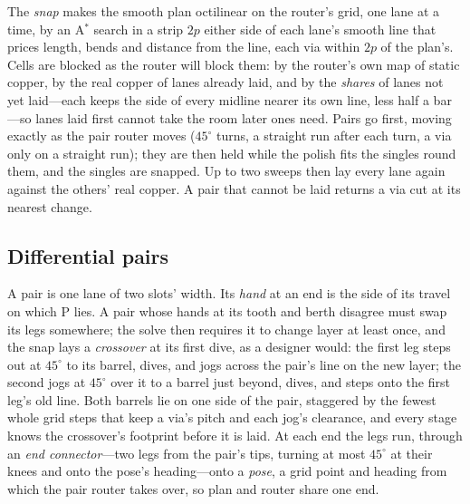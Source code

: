 \documentclass[journal]{IEEEtran}
\begin{document}
\label{sec:snap}The \emph{snap} makes the smooth plan octilinear on the router's grid, one lane at a time, by an A$^*$ search in a strip $2p$ either side of each lane's smooth line that prices length, bends and distance from the line, each via within $2p$ of the plan's. Cells are blocked as the router will block them: by the router's own map of static copper, by the real copper of lanes already laid, and by the \emph{shares} of lanes not yet laid---each keeps the side of every midline nearer its own line, less half a bar---so lanes laid first cannot take the room later ones need. Pairs go first, moving exactly as the pair router moves ($45^\circ$ turns, a straight run after each turn, a via only on a straight run); they are then held while the polish fits the singles round them, and the singles are snapped. Up to two sweeps then lay every lane again against the others' real copper. A pair that cannot be laid returns a via cut at its nearest change.

\subsection{Differential pairs}
\label{sec:pairs}
A pair is one lane of two slots' width. Its \emph{hand} at an end is the side of its travel on which P lies. A pair whose hands at its tooth and berth disagree must swap its legs somewhere; the solve then requires it to change layer at least once, and the snap lays a \emph{crossover} at its first dive, as a designer would: the first leg steps out at $45^\circ$ to its barrel, dives, and jogs across the pair's line on the new layer; the second jogs at $45^\circ$ over it to a barrel just beyond, dives, and steps onto the first leg's old line. Both barrels lie on one side of the pair, staggered by the fewest whole grid steps that keep a via's pitch and each jog's clearance, and every stage knows the crossover's footprint before it is laid. At each end the legs run, through an \emph{end connector}---two legs from the pair's tips, turning at most $45^\circ$ at their knees and onto the pose's heading---onto a \emph{pose}, a grid point and heading from which the pair router takes over, so plan and router share one end.
\end{document}
